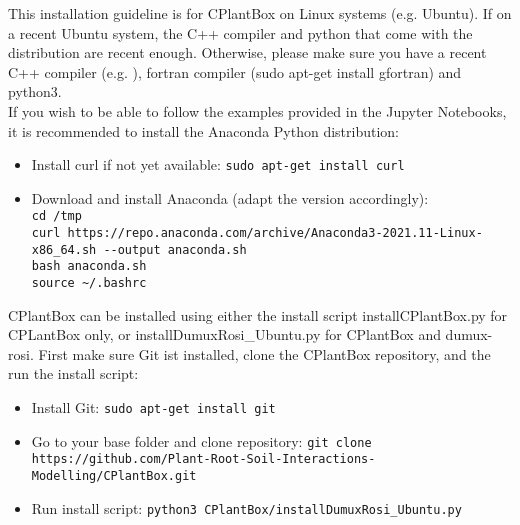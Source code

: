 This installation guideline is for CPlantBox on Linux systems (e.g. Ubuntu). 
If on a recent Ubuntu system, the C++ compiler and python that come with the distribution are recent enough. Otherwise, please make sure you have a recent C++ compiler (e.g.   ), fortran compiler (sudo apt-get install gfortran) and python3. \\

If you wish to be able to follow the examples provided in the Jupyter Notebooks, it is recommended to install the Anaconda Python distribution: 
\begin{itemize}
\item Install curl if not yet available: \lstinline{sudo apt-get install curl}
\item Download and install Anaconda (adapt the version accordingly):\\
\lstinline{cd /tmp}\\
\lstinline{curl https://repo.anaconda.com/archive/Anaconda3-2021.11-Linux-x86_64.sh --output anaconda.sh} \\
\lstinline{bash anaconda.sh} \\
\lstinline{source ~/.bashrc}
\end{itemize}

CPlantBox can be installed using either the install script installCPlantBox.py for CPLantBox only, or installDumuxRosi\_Ubuntu.py for CPlantBox and dumux-rosi. First make sure Git ist installed, clone the CPlantBox repository, and the run the install script:
\begin{itemize}
 \item Install Git: \lstinline{sudo apt-get install git}
 \item Go to your base folder and clone repository: \lstinline{git clone https://github.com/Plant-Root-Soil-Interactions-Modelling/CPlantBox.git}
 \item Run install script: \lstinline{python3 CPlantBox/installDumuxRosi_Ubuntu.py}  
\end{itemize}

